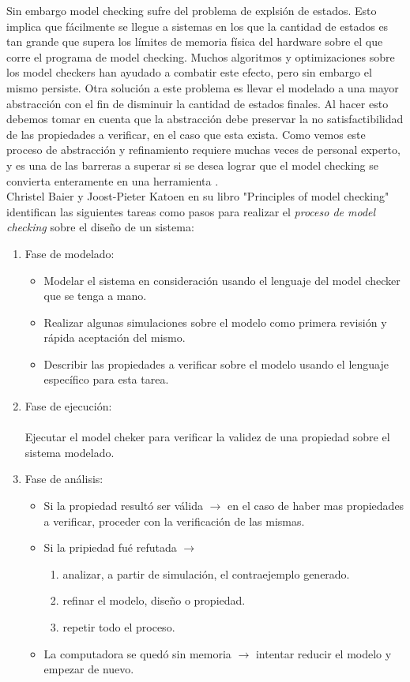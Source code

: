 \documentclass[titlepage, 12pt]{book}
\begin{document}
Sin embargo model checking sufre del problema de explsi\'on de estados. Esto implica que f\'acilmente se llegue a sistemas en los que la cantidad de estados es tan grande que supera los l\'imites de memoria f\'isica del hardware sobre el que corre el programa de model checking. Muchos algoritmos y optimizaciones sobre los model checkers han ayudado a combatir este efecto, pero sin embargo el mismo persiste. Otra soluci\'on a este problema es llevar el modelado a una mayor abstracci\'on con el fin de disminuir la cantidad de estados finales. Al hacer esto debemos tomar en cuenta que la abstracci\'on debe preservar la no satisfactibilidad de las propiedades a verificar, en el caso que esta exista. Como vemos este proceso de abstracci\'on y refinamiento requiere muchas veces de personal experto, y es una de las barreras a superar si se desea lograr que el model checking se convierta enteramente en una herramienta .\\

Christel Baier y Joost-Pieter Katoen en su libro "Principles of model checking" \cite{Baier} identifican las siguientes tareas como pasos para realizar el \textit{proceso de model checking} sobre el dise\~no de un sistema:

\begin{enumerate}
\item Fase de modelado:
\begin{itemize}
\item Modelar el sistema en consideraci\'on usando el lenguaje del model checker que se tenga a mano.
\item Realizar algunas simulaciones sobre el modelo como primera revisi\'on y r\'apida aceptaci\'on del mismo.
\item Describir las propiedades a verificar sobre el modelo usando el lenguaje espec\'ifico para esta tarea.
\end{itemize}
\item Fase de ejecuci\'on:\\\\
Ejecutar el model cheker para verificar la validez de una propiedad sobre el sistema modelado. 
\item Fase de an\'alisis:
\begin{itemize}
\item Si la propiedad result\'o ser v\'alida $\longrightarrow$ en el caso de haber mas propiedades a verificar, proceder con la verificaci\'on de las mismas.
\item Si la pripiedad fu\'e refutada $\longrightarrow$
\begin{enumerate}
\item analizar, a partir de simulaci\'on, el contraejemplo generado.
\item refinar el modelo, diseño o propiedad.
\item repetir todo el proceso.
\end{enumerate}
\item La computadora se qued\'o sin memoria $\longrightarrow$ intentar reducir el modelo y empezar de nuevo.
\end{itemize}
\end{enumerate}
\end{document}
